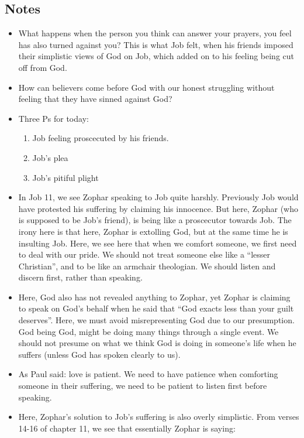 \subsection*{Notes}
\begin{itemize}
  \item{What happens when the person you think can answer your prayers, you feel has also turned against you? This is what Job felt, when his friends imposed their simplistic views of God on Job, which added on to his feeling being cut off from God.}
  \item{How can believers come before God with our honest struggling without feeling that they have sinned against God?}
  \item{Three Ps for today:
  \begin{enumerate}
    \item{Job feeling proscecuted by his friends.}
    \item{Job's plea}
    \item{Job's pitiful plight}
  \end{enumerate}}
  \item{In Job 11, we see Zophar speaking to Job quite harshly. Previously
  Job would have protested his suffering by claiming his innocence. But here,
  Zophar (who is supposed to be Job's friend), is being like a proscecutor
  towards Job. The irony here is that here, Zophar is extolling God, but at
  the same time he is insulting Job. Here, we see here that when we comfort
  someone, we first need to deal with our pride. We should not treat someone
  else like a ``lesser Christian'', and to be like an armchair theologian. We
  should listen and discern first, rather than speaking.}
  \item{Here, God also has not revealed anything to Zophar, yet Zophar is
  claiming to speak on God's behalf when he said that ``God exacts less than
  your guilt deserves''. Here, we must avoid misrepresenting God due to our
  presumption. God being God, might be doing many things through a single
  event. We should not presume on what we think God is doing in someone's life when he suffers (unless God has spoken clearly to us). }
  \item{As Paul said: love is patient. We need to have patience when
  comforting someone in their suffering, we need to be patient to listen
  first before speaking.}
  \item{Here, Zophar's solution to Job's suffering is also overly simplistic.
  From verses 14-16 of chapter 11, we see that essentially Zophar is saying:
}
\end{itemize}
